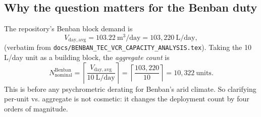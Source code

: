 \documentclass[11pt,a4paper]{article}
\begin{document}
\subsection{Why the question matters for the Benban duty}
The repository's Benban block demand is
\begin{equation}
V_{\mathrm{day,avg}} = 103.22\ \mathrm{m^3/day} = 103{,}220\ \mathrm{L/day},
\label{eq:benban_demand}
\end{equation}
(verbatim from \texttt{docs/BENBAN\_TEC\_VCR\_CAPACITY\_ANALYSIS.tex}). Taking the 10\,L/day unit as a building block, the \emph{aggregate count} is
\begin{equation}
N_{\mathrm{nominal}}^{\mathrm{Benban}} = \left\lceil \frac{V_{\mathrm{day,avg}}}{10\ \mathrm{L/day}} \right\rceil
= \left\lceil \frac{103{,}220}{10} \right\rceil = 10{,}322\ \text{units}.
\label{eq:benban_nominal_count}
\end{equation}
This is before any psychrometric derating for Benban's arid climate. So clarifying per-unit vs. aggregate is not cosmetic: it changes the deployment count by four orders of magnitude.
\end{document}
